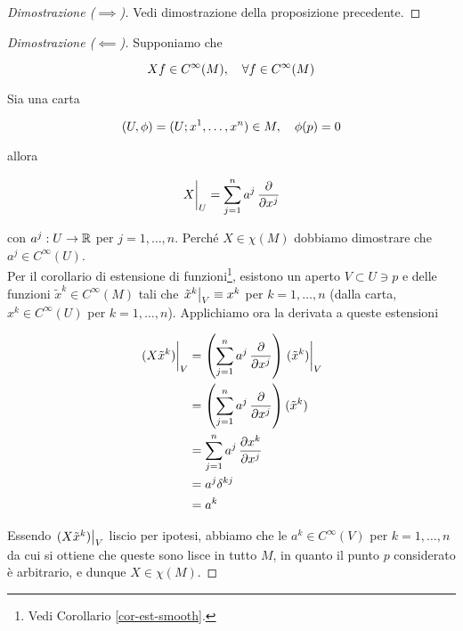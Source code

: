 \begin{proof}[Dimostrazione ($ \implies $)]
	Vedi dimostrazione della proposizione precedente.
\end{proof}

\begin{proof}[Dimostrazione ($ \impliedby $)]
	Supponiamo che
	
	\begin{equation}
		X f \in C^{\infty}(M) \qcomma \forall f \in C^{\infty}(M)
	\end{equation}

	Sia una carta
	
	\begin{equation}
		(U,\phi) = (U; x^{1},\dots,x^{n}) \in M \qcomma \phi(p) = 0
	\end{equation}
	
	allora
	
	\begin{equation}
		\eval{X}_{U} = \sum_{j=1}^{n} a^{j} \, \pdv{x^{j}}
	\end{equation}

	con $ a^{j} : U \to \mathbb{R} $ per $ j=1,\dots,n $. Perché $ X \in \chi(M) $ dobbiamo dimostrare che $ a^{j} \in C^{\infty}(U) $.\\
	Per il corollario di estensione di funzioni\footnote{%
		Vedi Corollario \ref{cor-est-smooth}.%
	}, esistono un aperto $ V \subset U \ni p $ e delle funzioni $ \tilde{x}^{k} \in C^{\infty}(M) $ tali che $ \eval{\tilde{x}^{k}}_{V} \equiv x^{k} $ per $ k=1,\dots,n $ (dalla carta, $ x^{k} \in C^{\infty}(U) $ per $ k=1,\dots,n $). Applichiamo ora la derivata a queste estensioni
	
	\begin{align}
		\begin{split}
			\eval{(X \tilde{x}^{k})}_{V} &= \left( \sum_{j=1}^{n} a^{j} \, \pdv{x^{j}} \right) \eval{(\tilde{x}^{k})}_{V} \\
			&= \left( \sum_{j=1}^{n} a^{j} \, \pdv{x^{j}} \right) (\tilde{x}^{k}) \\
			&= \sum_{j=1}^{n} a^{j} \, \pdv{x^{k}}{x^{j}} \\
			&= a^{j} \delta^{kj} \\
			&= a^{k}
		\end{split}
	\end{align}

	Essendo $ \eval{(X \tilde{x}^{k})}_{V} $ liscio per ipotesi, abbiamo che le $ a^{k} \in C^{\infty}(V) $ per $ k=1,\dots,n $ da cui si ottiene che queste sono lisce in tutto $ M $, in quanto il punto $ p $ considerato è arbitrario, e dunque $ X \in \chi(M) $.
\end{proof}

